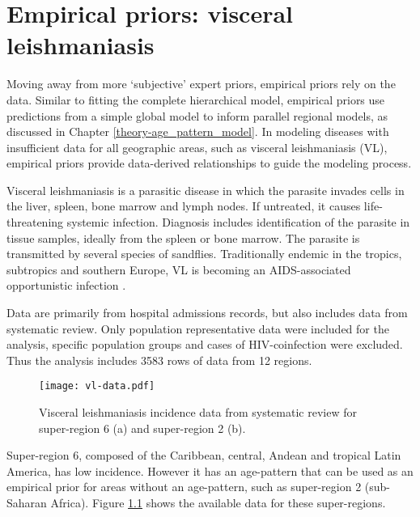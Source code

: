 \chapter{Empirical priors: visceral leishmaniasis}
\label{applications-priors_empirical}

Moving away from more `subjective' expert priors, empirical priors rely on the data.  Similar to fitting the complete hierarchical model, empirical priors use predictions from a simple global model to inform parallel regional models, as discussed in Chapter \ref{theory-age_pattern_model}.  In modeling diseases with insufficient data for all geographic areas, such as visceral leishmaniasis (VL), empirical priors provide data-derived relationships to guide the modeling process.

Visceral leishmaniasis is a parasitic disease in which the parasite invades cells in the liver, spleen, bone marrow and lymph nodes.  If untreated, it causes life-threatening systemic infection.  Diagnosis includes identification of the parasite in tissue samples, ideally from the spleen or bone marrow.  The parasite is transmitted by several species of sandflies.  Traditionally  endemic in the tropics, subtropics and southern Europe, VL is becoming an AIDS-associated opportunistic infection \cite{herwaldt_leishmaniasis_1999, zeledon_hemoflagellates_1996}.

Data are primarily from hospital admissions records, but also includes data from systematic review.  Only population representative data were included for the analysis, specific population groups and cases of HIV-coinfection were excluded.  Thus the analysis includes 3583 rows of data from 12 regions.

    \begin{figure}[h]
        \begin{center}
            \texttt{[image: vl-data.pdf]}
            \caption{Visceral leishmaniasis incidence data from systematic review for super-region 6 (a) and super-region 2 (b).}
            \label{fig:app-vl data}
        \end{center}
    \end{figure}

Super-region 6, composed of the Caribbean, central, Andean and tropical Latin America, has low incidence.  However it has an age-pattern that can be used as an empirical prior for areas without an age-pattern, such as super-region 2 (sub-Saharan Africa).  Figure \ref{fig:app-vl data} shows the available data for these super-regions.

